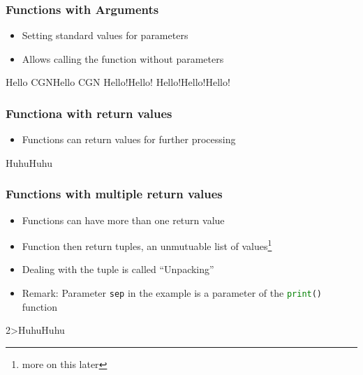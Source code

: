 \documentclass[ngerman]{beamer}
\newcommand{\ta}[1]{\textattachfile[color=1 0 0]{#1}{Code}}
\begin{document}
\begin{frame}[containsverbatim]
\frametitle{Functions with Arguments}

\begin{itemize}
	\item Setting standard values for parameters
	\item Allows calling the function without parameters
\end{itemize}



\begin{ausgabe}
Hello CGNHello CGN
Hello!Hello!
Hello!Hello!Hello!
\end{ausgabe}

\end{frame}

\begin{frame}[containsverbatim]
\frametitle{Functiona with return values}

\begin{itemize}
	\item Functions can return values for further processing
\end{itemize}



\begin{ausgabe}
HuhuHuhu
\end{ausgabe}

\end{frame}


\begin{frame}[containsverbatim]
\frametitle{Functions with multiple return values}

\begin{itemize}
	\item Functions can have more than one return value
	\item Function then return tuples, an unmutuable list of values\footnote{more on this later}
	\item Dealing with the tuple is called \enquote{Unpacking}
	\item Remark: Parameter \texttt{sep} in the example is a parameter \newline of the \lstinline[language={Python}]{print()}  function
\end{itemize}



\vspace*{-1em}
\begin{ausgabe}
2>HuhuHuhu
\end{ausgabe}
\end{frame}
\end{document}
